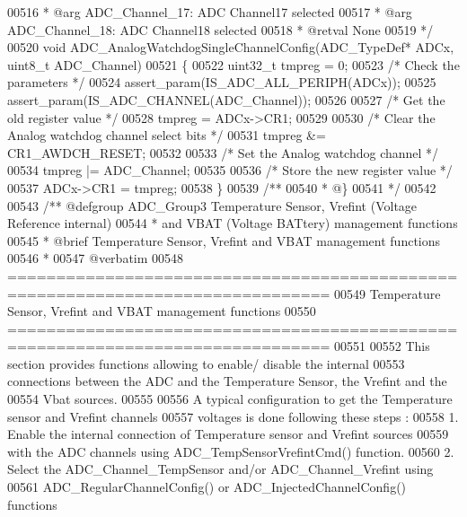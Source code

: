 \begin{DoxyCode}
00516 \textcolor{comment}{  *            @arg ADC\_Channel\_17: ADC Channel17 selected}
00517 \textcolor{comment}{  *            @arg ADC\_Channel\_18: ADC Channel18 selected}
00518 \textcolor{comment}{  * @retval None}
00519 \textcolor{comment}{  */}
00520 \textcolor{keywordtype}{void} ADC_AnalogWatchdogSingleChannelConfig(ADC\_TypeDef* ADCx, uint8\_t ADC\_Channel)
00521 \{
00522   uint32\_t tmpreg = 0;
00523   \textcolor{comment}{/* Check the parameters */}
00524   assert_param(IS\_ADC\_ALL\_PERIPH(ADCx));
00525   assert_param(IS\_ADC\_CHANNEL(ADC\_Channel));
00526 
00527   \textcolor{comment}{/* Get the old register value */}
00528   tmpreg = ADCx->CR1;
00529 
00530   \textcolor{comment}{/* Clear the Analog watchdog channel select bits */}
00531   tmpreg &= CR1_AWDCH_RESET;
00532 
00533   \textcolor{comment}{/* Set the Analog watchdog channel */}
00534   tmpreg |= ADC\_Channel;
00535 
00536   \textcolor{comment}{/* Store the new register value */}
00537   ADCx->CR1 = tmpreg;
00538 \}
00539 \textcolor{comment}{/**}
00540 \textcolor{comment}{  * @\}}
00541 \textcolor{comment}{  */}
00542 
00543 \textcolor{comment}{/** @defgroup ADC\_Group3 Temperature Sensor, Vrefint (Voltage Reference internal) }
00544 \textcolor{comment}{ *            and VBAT (Voltage BATtery) management functions}
00545 \textcolor{comment}{ *  @brief   Temperature Sensor, Vrefint and VBAT management functions }
00546 \textcolor{comment}{ *}
00547 \textcolor{comment}{@verbatim   }
00548 \textcolor{comment}{ ===============================================================================}
00549 \textcolor{comment}{               Temperature Sensor, Vrefint and VBAT management functions}
00550 \textcolor{comment}{ ===============================================================================  }
00551 \textcolor{comment}{}
00552 \textcolor{comment}{  This section provides functions allowing to enable/ disable the internal }
00553 \textcolor{comment}{  connections between the ADC and the Temperature Sensor, the Vrefint and the}
00554 \textcolor{comment}{  Vbat sources.}
00555 \textcolor{comment}{     }
00556 \textcolor{comment}{  A typical configuration to get the Temperature sensor and Vrefint channels }
00557 \textcolor{comment}{  voltages is done following these steps :}
00558 \textcolor{comment}{   1. Enable the internal connection of Temperature sensor and Vrefint sources }
00559 \textcolor{comment}{      with the ADC channels using ADC\_TempSensorVrefintCmd() function. }
00560 \textcolor{comment}{   2. Select the ADC\_Channel\_TempSensor and/or ADC\_Channel\_Vrefint using }
00561 \textcolor{comment}{      ADC\_RegularChannelConfig() or  ADC\_InjectedChannelConfig() functions }

\end{DoxyCode}
